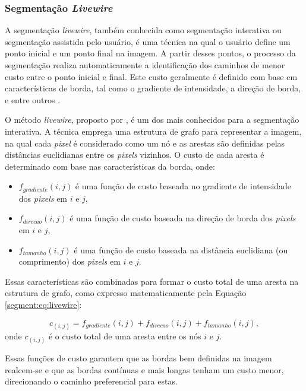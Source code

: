 \subsubsection{Segmentação \textit{Livewire}}
\label{segment:livewire}
A segmentação \textit{livewire}, também conhecida como segmentação interativa ou segmentação assistida pelo usuário, é uma técnica na qual o usuário define um ponto inicial e um ponto final na imagem. A partir desses pontos, o processo da segmentação realiza automaticamente a identificação dos caminhos de menor custo entre o ponto inicial e final. Este custo geralmente é definido com base em características de borda, tal como o gradiente de intensidade, a direção de borda, e entre outros \citep{Falcao1997Paradigmas3D-Live-Wire}.

O método \textit{livewire}, proposto por \cite{Barrett1997InteractiveExtraction}, é um dos mais conhecidos para a segmentação interativa. A técnica emprega uma estrutura de grafo para representar a imagem, na qual cada \textit{pixel} é considerado como um nó e as arestas são definidas pelas distâncias euclidianas entre os \textit{pixels} vizinhos. O custo de cada aresta é determinado com base nas características da borda, onde:

\begin{itemize}
    \item $f_{gradiente}(i, j)$ é uma função de custo baseada no gradiente de intensidade dos \textit{pixels} em $i$ e $j$,
    \item $f_{direcao}(i, j)$ é uma função de custo baseada na direção de borda dos \textit{pixels} em $i$ e $j$,
    \item $f_{tamanho}(i, j)$ é uma função de custo baseada na distância euclidiana (ou comprimento) dos \textit{pixels} em $i$ e $j$.
\end{itemize}

Essas características são combinadas para formar o custo total de uma aresta na estrutura de grafo, como expresso matematicamente pela Equação \ref{segment:eq:livewire}:

\begin{equation}
    \label{segment:eq:livewire}
    c_{(i, j)} = f_{gradiente}(i, j) + f_{direcao}(i, j) + f_{tamanho}(i, j),
\end{equation}
onde $c_{(i, j)}$ é o custo total de uma aresta entre os nós $i$ e $j$. 

Essas funções de custo garantem que as bordas bem definidas na imagem realcem-se e que as bordas contínuas e mais longas tenham um custo menor, direcionando o caminho preferencial para estas.

